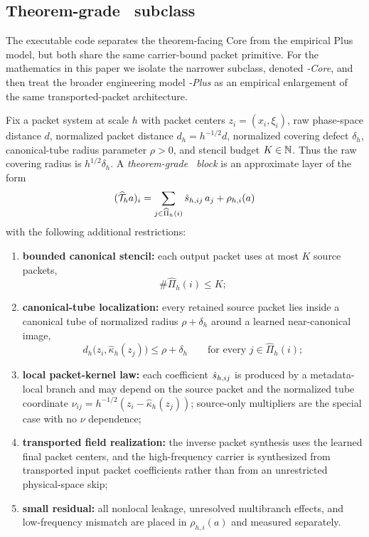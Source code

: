 \subsection{Theorem-grade \MiNO\ subclass}
\label{sec:theorem-grade-mino}

The executable code separates the theorem-facing Core from the empirical Plus model, but both share the same carrier-bound packet primitive. For the mathematics in this paper we isolate the narrower subclass, denoted \emph{\MiNO-Core}, and then treat the broader engineering model \emph{\MiNO-Plus} as an empirical enlargement of the same transported-packet architecture.

\begin{definition}
\label{def:theorem-grade-mino}
Fix a packet system at scale $h$ with packet centers $z_i=(x_i,\xi_i)$, raw
phase-space distance $d$, normalized packet distance $d_h=h^{-1/2}d$, normalized
covering defect $\delta_h$, canonical-tube radius parameter $\rho>0$, and stencil
budget $K\in\mathbb N$.  Thus the raw covering radius is $h^{1/2}\delta_h$.  A
\emph{theorem-grade \MiNO\ block} is an approximate layer of the form
\[
(\widehat{\mathcal T}_h a)_i
=
\sum_{j\in \widehat\Pi_h(i)}
\hat s_{h,ij}\, a_j + \rho_{h,i}(a)
\]
with the following additional restrictions:
\begin{enumerate}
\item \textbf{bounded canonical stencil:} each output packet uses at most $K$ source packets,
\[
\#\widehat\Pi_h(i)\le K;
\]
\item \textbf{canonical-tube localization:} every retained source packet lies inside a canonical tube of normalized radius $\rho+\delta_h$ around a learned near-canonical image,
\[
d_h\bigl(z_i,\widehat{\kappa}_h(z_j)\bigr)\le \rho+\delta_h
\qquad\text{for every }j\in\widehat\Pi_h(i);
\]
\item \textbf{local packet-kernel law:} each coefficient $\hat s_{h,ij}$ is produced by a metadata-local branch and may depend on the source packet and the normalized tube coordinate $\nu_{ij}=h^{-1/2}(z_i-\widehat\kappa_h(z_j))$; source-only multipliers are the special case with no $\nu$ dependence;
\item \textbf{transported field realization:} the inverse packet synthesis uses the learned final packet centers, and the high-frequency carrier is synthesized from transported input packet coefficients rather than from an unrestricted physical-space skip;
\item \textbf{small residual:} all nonlocal leakage, unresolved multibranch effects, and low-frequency mismatch are placed in $\rho_{h,i}(a)$ and measured separately.
\end{enumerate}
\end{definition}

